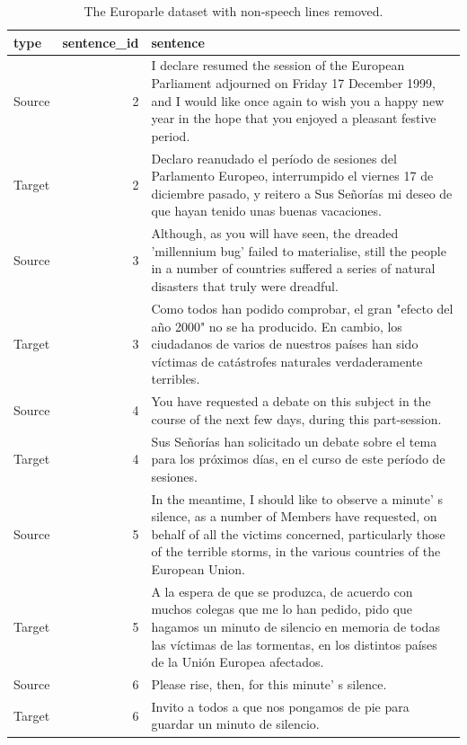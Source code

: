 \documentclass[
  letterpaper,
]{latex/krantz}
\begin{document}
\hypertarget{tbl-normalize-non-speech-remove-europarle}{}
\begin{table}
\caption{\label{tbl-normalize-non-speech-remove-europarle}The Europarle dataset with non-speech lines removed. }\tabularnewline

\centering
\begin{tabular}{lrl}
\toprule
type & sentence\_id & sentence\\
\midrule
Source & 2 & I declare resumed the session of the European Parliament adjourned on Friday 17 December 1999, and I would like once again to wish you a happy new year in the hope that you enjoyed a pleasant festive period.\\
Target & 2 & Declaro reanudado el período de sesiones del Parlamento Europeo, interrumpido el viernes 17 de diciembre pasado, y reitero a Sus Señorías mi deseo de que hayan tenido unas buenas vacaciones.\\
Source & 3 & Although, as you will have seen, the dreaded 'millennium bug' failed to materialise, still the people in a number of countries suffered a series of natural disasters that truly were dreadful.\\
Target & 3 & Como todos han podido comprobar, el gran "efecto del año 2000" no se ha producido. En cambio, los ciudadanos de varios de nuestros países han sido víctimas de catástrofes naturales verdaderamente terribles.\\
Source & 4 & You have requested a debate on this subject in the course of the next few days, during this part-session.\\
\addlinespace
Target & 4 & Sus Señorías han solicitado un debate sobre el tema para los próximos días, en el curso de este período de sesiones.\\
Source & 5 & In the meantime, I should like to observe a minute' s silence, as a number of Members have requested, on behalf of all the victims concerned, particularly those of the terrible storms, in the various countries of the European Union.\\
Target & 5 & A la espera de que se produzca, de acuerdo con muchos colegas que me lo han pedido, pido que hagamos un minuto de silencio en memoria de todas las víctimas de las tormentas, en los distintos países de la Unión Europea afectados.\\
Source & 6 & Please rise, then, for this minute' s silence.\\
Target & 6 & Invito a todos a que nos pongamos de pie para guardar un minuto de silencio.\\

\end{tabular}
\end{table}
\end{document}
